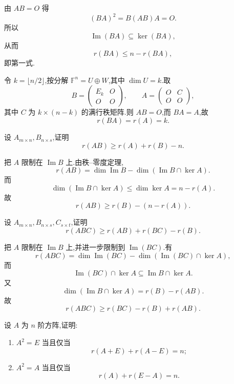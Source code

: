 \begin{solution}
由 $AB=O$ 得
\[
 (BA)^2=B(AB)A=O.
\]
所以
\[
 \operatorname{Im}(BA)\subseteq\ker(BA),
\]
从而
\[
 r(BA)\leq n-r(BA),
\]
即第一式.

令 $k=\lfloor n/2\rfloor$,按分解 $\mathbb{F}^n=U\oplus W$,其中 $\dim U=k$.取
\[
 B=\begin{pmatrix}E_k&O\\O&O\end{pmatrix},
 \qquad
 A=\begin{pmatrix}O&C\\O&O\end{pmatrix},
\]
其中 $C$ 为 $k\times(n-k)$ 的满行秩矩阵.则 $AB=O$,而 $BA=A$,故
\[
 r(BA)=r(A)=k.
\]
\end{solution}

\begin{example}
设 $A_{m\times n},B_{n\times s}$,证明
\[
 r(AB)\geq r(A)+r(B)-n.
\]
\end{example}
\exampleblank

\begin{solution}
把 $A$ 限制在 $\operatorname{Im}B$ 上.由秩--零度定理,
\[
 r(AB)
 =\dim\operatorname{Im}B-
 \dim(\operatorname{Im}B\cap\ker A).
\]
而
\[
 \dim(\operatorname{Im}B\cap\ker A)
 \leq\dim\ker A=n-r(A).
\]
故
\[
 r(AB)\geq r(B)-(n-r(A)).
\]
\end{solution}

\begin{example}
设 $A_{m\times n},B_{n\times s},C_{s\times t}$,证明
\[
 r(ABC)\geq r(AB)+r(BC)-r(B).
\]
\end{example}
\exampleblank

\begin{solution}
把 $A$ 限制在 $\operatorname{Im}B$ 上,并进一步限制到 $\operatorname{Im}(BC)$.有
\[
 r(ABC)=\dim\operatorname{Im}(BC)-\dim(\operatorname{Im}(BC)\cap\ker A),
\]
而
\[
 \operatorname{Im}(BC)\cap\ker A
 \subseteq \operatorname{Im}B\cap\ker A.
\]
又
\[
 \dim(\operatorname{Im}B\cap\ker A)=r(B)-r(AB).
\]
故
\[
 r(ABC)\geq r(BC)-r(B)+r(AB).
\]
\end{solution}

\begin{example}
设 $A$ 为 $n$ 阶方阵,证明:
\begin{enumerate}
  \item $A^2=E$ 当且仅当
  \[
  r(A+E)+r(A-E)=n;
  \]
  \item $A^2=A$ 当且仅当
  \[
  r(A)+r(E-A)=n.
  \]
\end{enumerate}
\end{example}
\exampleblank


